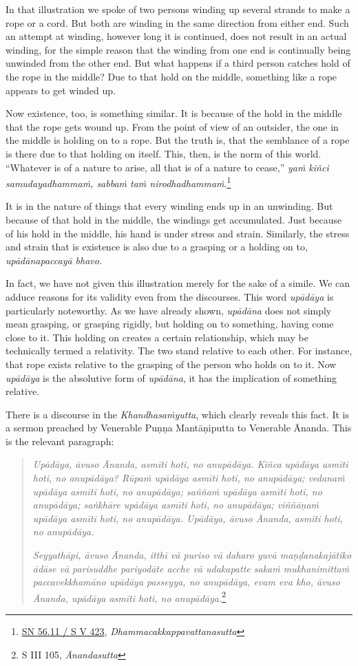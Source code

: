 In that illustration we spoke of two persons winding up several strands to make a rope or a cord. But both are winding in the same direction from either end. Such an attempt at winding, however long it is continued, does not result in an actual winding, for the simple reason that the winding from one end is continually being unwinded from the other end. But what happens if a third person catches hold of the rope in the middle? Due to that hold on the middle, something like a rope appears to get winded up.

Now existence, too, is something similar. It is because of the hold in the middle that the rope gets wound up. From the point of view of an outsider, the one in the middle is holding on to a rope. But the truth is, that the semblance of a rope is there due to that holding on itself. This, then, is the norm of this world. ``Whatever is of a nature to arise, all that is of a nature to cease,'' \emph{yaṁ kiñci samudayadhammaṁ, sabbaṁ taṁ nirodhadhammaṁ}.\footnote{\href{https://suttacentral.net/sn56.11/pli/ms}{SN 56.11 / S V 423}, \emph{Dhammacakkappavattanasutta}}

It is in the nature of things that every winding ends up in an unwinding. But because of that hold in the middle, the windings get accumulated. Just because of his hold in the middle, his hand is under stress and strain. Similarly, the stress and strain that is existence is also due to a grasping or a holding on to, \emph{upādānapaccayā bhavo}.

In fact, we have not given this illustration merely for the sake of a simile. We can adduce reasons for its validity even from the discourses. This word \emph{upādāya} is particularly noteworthy. As we have already shown, \emph{upādāna} does not simply mean grasping, or grasping rigidly, but holding on to something, having come close to it. This holding on creates a certain relationship, which may be technically termed a relativity. The two stand relative to each other. For instance, that rope exists relative to the grasping of the person who holds on to it. Now \emph{upādāya} is the absolutive form of \emph{upādāna}, it has the implication of something relative.

There is a discourse in the \emph{Khandhasaṁyutta}, which clearly reveals this fact. It is a sermon preached by Venerable Puṇṇa Mantāṇiputta to Venerable Ānanda. This is the relevant paragraph:

\begin{quote}
\emph{Upādāya, āvuso Ānanda, asmīti hoti, no anupādāya. Kiñca upādāya asmīti hoti, no anupādāya? Rūpaṁ upādāya asmīti hoti, no anupādāya; vedanaṁ upādāya asmīti hoti, no anupādāya; saññaṁ upādāya asmīti hoti, no anupādāya; saṅkhāre upādāya asmīti hoti, no anupādāya; viññāṇaṁ upādāya asmīti hoti, no anupādāya. Upādāya, āvuso Ānanda, asmīti hoti, no anupādāya.}

\emph{Seyyathāpi, āvuso Ānanda, itthī vā puriso vā daharo yuvā maṇḍanakajātiko ādāse vā parisuddhe pariyodāte acche vā udakapatte sakaṁ mukhanimittaṁ paccavekkhamāno upādāya passeyya, no anupādāya, evam eva kho, āvuso Ānanda, upādāya asmīti hoti, no anupādāya.}\footnote{S III 105, \emph{Ānandasutta}}
\end{quote}

